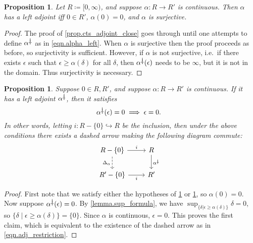 \documentclass[11pt, one side, article]{memoir}
\theoremstyle{definition}
\theoremstyle{plain}
\newtheorem{proposition}[definitionx]{Proposition}
\newcommand{\inj}{\hookrightarrow}
\newcommand{\ldag}{^{\rotatebox{180}{$\dagger$}}}
\newcommand{\inv}{^{-1}}
\begin{document}
\begin{proposition}\label{prop.cts_v1}
Let $R\coloneqq [0,\infty)$, and suppose $\alpha\colon R\to R'$ is continuous. Then $\alpha$ has a left adjoint iff $0\in R'$, $\alpha(0)=0$, and $\alpha$ is surjective.
\end{proposition}
\begin{proof}
	The proof of \cref{prop.cts_adjoint_close} goes through until one attempts to define $\alpha\ldag$ as in \eqref{eqn.alpha_left}. When $\alpha$ is surjective then the proof proceeds as before, so surjectivity is sufficient. However, if $\alpha$ is not surjective, i.e.\ if there exists $\epsilon$ such that $\epsilon\geq\alpha(\delta)$ for all $\delta$, then $\alpha\ldag(\epsilon)$ needs to be $\infty$, but it is not in the domain. Thus surjectivity is necessary.
\end{proof}

\begin{proposition}\label{prop.cts_v2}
Suppose $0\in R,R'$, and suppose $\alpha\colon R\to R'$ is continuous. If it has a left adjoint $\alpha\ldag$, then it satisfies
\begin{equation}\label{eqn.adj_restriction}
	\alpha\ldag(\epsilon)=0\implies
	\epsilon=0.
\end{equation}
In other words, letting $i\colon R-\{0\}\inj R$ be the inclusion, then under the above conditions there exists a dashed arrow making the following diagram commute:
\begin{equation}\label{eqn.adj_restriction_diagram}
\begin{tikzcd}
	R-\{0\}\ar[r, "i"]\ar[d, dashed, "\Delta_\alpha"']&
	R\ar[d, "\alpha\ldag"]\\
	R'-\{0\}\ar[r, "i"']&
	R'
\end{tikzcd}
\end{equation}
\end{proposition}
\begin{proof}
First note that we satisfy either the hypotheses of \cref{prop.cts_v1} or \cref{prop.cts_v2}, so $\alpha(0)=0$. Now suppose $\alpha\ldag(\epsilon)=0$. By \cref{lemma.sup_formula}, we have $\sup_{\{\delta|\epsilon\geq\alpha(\delta)\}}\delta=0$, so $\{\delta\mid\epsilon\geq\alpha(\delta)\}=\{0\}$. Since $\alpha$ is
continuous, $\epsilon=0$. This proves the first claim, which is equivalent to the existence of the dashed arrow as in \eqref{eqn.adj_restriction}.
%
\end{proof}
\end{document}
